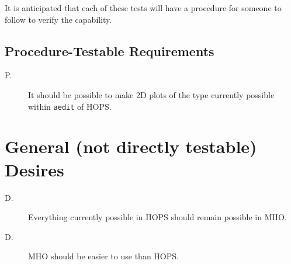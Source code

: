 It is anticipated that each of these tests will have a procedure
for someone to follow to verify the capability.

\subsection{Procedure-Testable Requirements}
\label{sec:procedure}

\begin{description}
\item[P.\thereq] It should be possible to make 2D plots of the type
currently possible within \texttt{\ac{aedit}} of \ac{HOPS}.
\end{description}

\section{General (not directly testable) Desires}
\label{sec:desires}

\begin{description}
\item[D.\thereq] Everything currently possible in \ac{HOPS} should remain
possible in \ac{MHO}.
\item[D.\thereq] \ac{MHO} should be easier to use than \ac{HOPS}.
\end{description}

%
%
